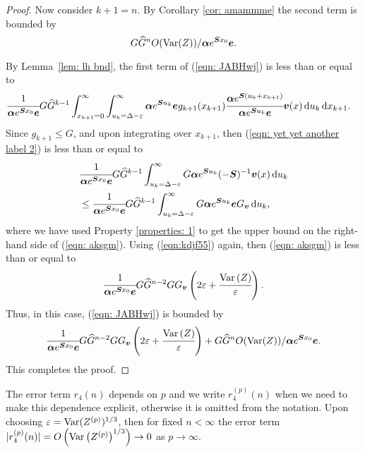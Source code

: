 \begin{proof}
	Now consider \(k+1=n\). By Corollary \ref{cor: amammme} the second term is bounded by 
	\[G\widehat G^{n}O(\mathrm{Var}(Z))/\boldsymbol \alpha e^{\boldsymbol{S}x_0}\boldsymbol e.\]

	By Lemma~\ref{lem: lh bnd}, the first term of (\ref{eqn: JABHwj}) is less than or equal to 
	\begin{align}
		&\cfrac{1}{\boldsymbol \alpha e^{\boldsymbol{S} x_0 }\boldsymbol e}G \widehat G^{k-1}
		\int_{x_{k+1}=0}^\infty \int_{u_k=\Delta-\varepsilon}^\infty \boldsymbol \alpha e^{\boldsymbol{S}u_k}\boldsymbol e g_{k+1}(x_{k+1}) \cfrac{\boldsymbol\alpha e^{\boldsymbol{S}(u_k+x_{k+1})}}{\boldsymbol \alpha e^{\boldsymbol{S}u_k}\boldsymbol e}\boldsymbol v(x)\, \mathrm{d} u_k \, \mathrm{d} x_{k+1}. \label{eqn: yet yet another label 2}
		\end{align}
		{Since \(g_{k+1}\leq G\), and upon integrating over \(x_{k+1}\), then (\ref{eqn: yet yet another label 2}) is less than or equal to }
		\begin{align}
		& \cfrac{1}{\boldsymbol \alpha e^{\boldsymbol{S} x_0 }\boldsymbol e}G \widehat G^{k-1}  
		\int_{u_k=\Delta-\varepsilon}^\infty G \boldsymbol\alpha e^{\boldsymbol{S}u_k}(-\boldsymbol S)^{-1}{\boldsymbol v}(x) \, \mathrm{d} u_k\nonumber 
		\\&\leq \cfrac{1}{\boldsymbol \alpha e^{\boldsymbol{S} x_0 }\boldsymbol e}G \widehat G^{k-1}  
		\int_{u_k=\Delta-\varepsilon}^\infty G \boldsymbol \alpha e^{\boldsymbol S u_k} \boldsymbol e G_{\boldsymbol v} \, \mathrm{d} u_k , \label{eqn: aksgm}
	\end{align}
	where we have used Property \ref{properties: 1} to get the upper bound on the right-hand side of (\ref{eqn: aksgm}). Using (\ref{eqn:kdjf55}) again, then (\ref{eqn: aksgm}) is less than or equal to
	\begin{align}
		\cfrac{1}{\boldsymbol \alpha e^{\boldsymbol{S} x_0 }\boldsymbol e}G\widehat G^{n-2}   G G_{\boldsymbol v}\left(2\varepsilon + \cfrac{\mathrm{Var}\left(Z\right)}{\varepsilon}\right).
	\end{align}
	Thus, in this case, (\ref{eqn: JABHwj}) is bounded by 
	\[\cfrac{1}{\boldsymbol \alpha e^{\boldsymbol{S} x_0 }\boldsymbol e}G\widehat G^{n-2}   G G_{\boldsymbol v}\left(2\varepsilon + \cfrac{\mathrm{Var}\left(Z\right)}{\varepsilon}\right) + G\widehat G^{n}O(\mathrm{Var}(Z))/\boldsymbol \alpha e^{\boldsymbol{S}x_0}\boldsymbol e.\]
	This completes the proof.  
\end{proof}

The error term \(r_4(n)\) depends on \(p\) and we write \(r_4^{(p)}(n)\) when we need to make this dependence explicit, otherwise it is omitted from the notation. Upon choosing \(\varepsilon = \mathrm{Var}(Z^{(p)})^{1/3}\), then for fixed \(n<\infty\) the error term \(|r_4^{(p)}(n)|= O\left(\mathrm{Var}\left(Z^{(p)}\right)^{1/3}\right)\to 0\) as \(p\to\infty\). 

